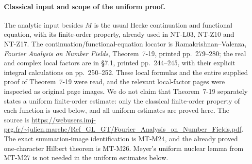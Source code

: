 \paragraph{Classical input and scope of the uniform proof.}
The analytic input besides \(M\) is the usual Hecke
continuation and functional equation, with its finite-order
property, already used in NT-L03, NT-Z10 and NT-Z17.
The continuation/functional-equation locator is
Ramakrishnan--Valenza, \emph{Fourier Analysis on Number Fields},
Theorem~7-19, printed pp.~279--280; the real and complex
local factors are in \S7.1, printed pp.~244--245, with their
explicit integral calculations on pp.~250--252.
These local formulas and the entire supplied proof of
Theorem~7-19 were read, and the relevant local-factor pages
were inspected as original page images. We do not claim that
Theorem~7-19 separately states a uniform finite-order estimate:
only the classical finite-order property of each function is
used below, and all uniform estimates are proved here.
The source is
\url{https://webusers.imj-prg.fr/~julien.marche/Ref_GL_GT/Fourier_Analysis_on_Number_Fields.pdf}.
The exact summation-image identification is MT-M24, and
the already proved one-character Hilbert theorem is MT-M26.
Meyer's uniform nuclear lemma from MT-M27 is not needed in
the uniform estimates below.

